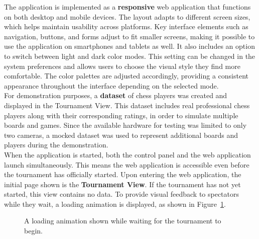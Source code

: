 The application is implemented as a \textbf{responsive} web application that functions on both desktop and mobile devices. The layout adapts to different screen sizes, which helps maintain usability across platforms. Key interface elements such as navigation, buttons, and forms adjust to fit smaller screens, making it possible to use the application on smartphones and tablets as well. It also includes an option to switch between light and dark color modes. This setting can be changed in the system preferences and allows users to choose the visual style they find more comfortable. The color palettes are adjusted accordingly, providing a consistent appearance throughout the interface depending on the selected mode. \\

For demonstration purposes, a \textbf{dataset} of chess players was created and displayed in the Tournament View. This dataset includes real professional chess players along with their corresponding ratings, in order to simulate multiple boards and games. Since the available hardware for testing was limited to only two cameras, a mocked dataset was used to represent additional boards and players during the demonstration. \\

When the application is started, both the control panel and the web application launch simultaneously. This means the web application is accessible even before the tournament has officially started. Upon entering the web application, the initial page shown is the \textbf{Tournament View}. If the tournament has not yet started, this view contains no data. To provide visual feedback to spectators while they wait, a loading animation is displayed, as shown in Figure~\ref{fig:tournament-view-loading}.\\

\begin{figure}[h!] \centering {}\caption[Loading animation]{A loading animation shown while waiting for the tournament to begin.}\label{fig:tournament-view-loading} \end{figure}


